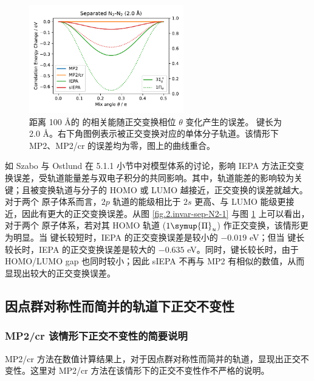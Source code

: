 \begin{figure}[!ht]
  \centering
  \includegraphics[width=0.6\textwidth]{assets/invar-sep-N2-2.pdf}
  \caption{距离 100 \AA 的  的相关能随正交变换相位 $\theta$ 变化产生的误差。 键长为 2.0 \AA。右下角图例表示被正交变换对应的单体分子轨道。该情形下 MP2、MP2/cr 的误差均为零，图上的曲线重合。}
  \label{fig.2.invar-sep-N2-2}
\end{figure}

如 Szabo 与 Ostlund 在 5.1.1 小节中对模型体系的讨论\cite{Szabo-Ostlund.Dover.1996}，影响 IEPA 方法正交变换误差，受轨道能量差与双电子积分的共同影响。其中，轨道能差的影响较为关键；且被变换轨道与分子的 HOMO 或 LUMO 越接近，正交变换的误差就越大。对于两个  原子体系而言，$2p$ 轨道的能级相比于 $2s$ 更高、与 LUMO 能级更接近，因此有更大的正交变换误差。从图 \ref{fig.2.invar-sep-N2-1} 与图 \ref{fig.2.invar-sep-N2-2} 上可以看出，对于两个  原子体系，若对其 HOMO 轨道 ($1 \symup{\Pi}_u$) 作正交变换，该情形更为明显。当  键长较短时，IEPA 的正交变换误差是较小的 $-0.019$ eV；但当  键长较长时，IEPA 的正交变换误差是较大的 $-0.635$ eV。同时，键长较长时，由于 HOMO/LUMO gap 也同时较小；因此 sIEPA 不再与 MP2 有相似的数值，从而显现出较大的正交变换误差。

\subsection{因点群对称性而简并的轨道下正交不变性}

\subsubsection{MP2/cr 该情形下正交不变性的简要说明}

MP2/cr 方法在数值计算结果上，对于因点群对称性而简并的轨道，显现出正交不变性。这里对 MP2/cr 方法在该情形下的正交不变性作不严格的说明。

